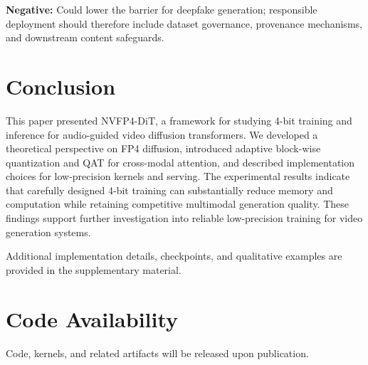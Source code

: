 \documentclass[journal,twoside]{IEEEtran}
\theoremstyle{definition}
\theoremstyle{remark}
\begin{document}
\textbf{Negative:} Could lower the barrier for deepfake generation; responsible deployment should therefore include dataset governance, provenance mechanisms, and downstream content safeguards.

\section{Conclusion}
\label{sec:conclusion}

This paper presented NVFP4-DiT, a framework for studying 4-bit training and inference for audio-guided video diffusion transformers. We developed a theoretical perspective on FP4 diffusion, introduced adaptive block-wise quantization and QAT for cross-modal attention, and described implementation choices for low-precision kernels and serving. The experimental results indicate that carefully designed 4-bit training can substantially reduce memory and computation while retaining competitive multimodal generation quality. These findings support further investigation into reliable low-precision training for video generation systems.

Additional implementation details, checkpoints, and qualitative examples are provided in the supplementary material.

\section*{Code Availability}
Code, kernels, and related artifacts will be released upon publication.
\end{document}
